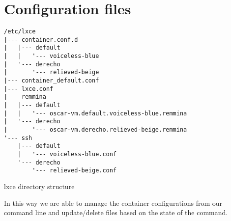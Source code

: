 \newpage\newpage\section{Configuration files}

\begin{listing}[H]
\begin{verbatim}
/etc/lxce 
|--- container.conf.d 			
|   |--- default 			
|   |   '--- voiceless-blue
|   '--- derecho 			
|       '--- relieved-beige
|--- container_default.conf 		
|--- lxce.conf 			
|--- remmina 		
|   |--- default 
|   |   '--- oscar-vm.default.voiceless-blue.remmina
|   '--- derecho 
|       '--- oscar-vm.derecho.relieved-beige.remmina
'--- ssh 	
    |--- default 
    |   '--- voiceless-blue.conf
    '--- derecho
        '--- relieved-beige.conf
\end{verbatim}
\caption{lxce directory structure}
\label{listings: lxce directory structure /etc/lxce}
\end{listing}

In this way we are able to manage the container configurations from our command line and update/delete files based on the state of the command.

